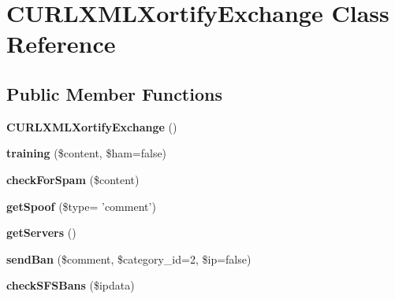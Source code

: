 \hypertarget{class_c_u_r_l_x_m_l_xortify_exchange}{\section{C\-U\-R\-L\-X\-M\-L\-Xortify\-Exchange Class Reference}
\label{class_c_u_r_l_x_m_l_xortify_exchange}
}
\subsection*{Public Member Functions}
\begin{DoxyCompactItemize}
\item 
\hypertarget{class_c_u_r_l_x_m_l_xortify_exchange_a6b1b2a19df0aa8d9932a47aa74215d38}{{\bfseries C\-U\-R\-L\-X\-M\-L\-Xortify\-Exchange} ()}\label{class_c_u_r_l_x_m_l_xortify_exchange_a6b1b2a19df0aa8d9932a47aa74215d38}

\item 
\hypertarget{class_c_u_r_l_x_m_l_xortify_exchange_a515fbc4a5ef040f21eae592b133ec26d}{{\bfseries training} (\$content, \$ham=false)}\label{class_c_u_r_l_x_m_l_xortify_exchange_a515fbc4a5ef040f21eae592b133ec26d}

\item 
\hypertarget{class_c_u_r_l_x_m_l_xortify_exchange_a07987d81ac5eac816ab9f4b643ddd002}{{\bfseries check\-For\-Spam} (\$content)}\label{class_c_u_r_l_x_m_l_xortify_exchange_a07987d81ac5eac816ab9f4b643ddd002}

\item 
\hypertarget{class_c_u_r_l_x_m_l_xortify_exchange_a41e4a3423e0c31ef5315b5d9cc750b71}{{\bfseries get\-Spoof} (\$type= 'comment')}\label{class_c_u_r_l_x_m_l_xortify_exchange_a41e4a3423e0c31ef5315b5d9cc750b71}

\item 
\hypertarget{class_c_u_r_l_x_m_l_xortify_exchange_a4de03c57a47894e40ed7349dba65fdcc}{{\bfseries get\-Servers} ()}\label{class_c_u_r_l_x_m_l_xortify_exchange_a4de03c57a47894e40ed7349dba65fdcc}

\item 
\hypertarget{class_c_u_r_l_x_m_l_xortify_exchange_afb8eed151c4df3eed83f04c73119e774}{{\bfseries send\-Ban} (\$comment, \$category\-\_\-id=2, \$ip=false)}\label{class_c_u_r_l_x_m_l_xortify_exchange_afb8eed151c4df3eed83f04c73119e774}

\item 
\hypertarget{class_c_u_r_l_x_m_l_xortify_exchange_afbd21462b3bd60c70109973e828ad4db}{{\bfseries check\-S\-F\-S\-Bans} (\$ipdata)}\label{class_c_u_r_l_x_m_l_xortify_exchange_afbd21462b3bd60c70109973e828ad4db}


\end{DoxyCompactItemize}
